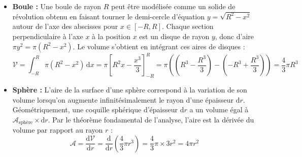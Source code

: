 \documentclass{article}
\begin{document}
{\begin{itemize}
    \begin{center}
    \end{center}

    \item \textbf{Boule :}
    Une boule de rayon $R$ peut être modélisée comme un solide de révolution obtenu en faisant tourner le demi-cercle d'équation $y = \sqrt{R^2 - x^2}$ autour de l'axe des abscisses pour $x \in [-R, R]$. Chaque section perpendiculaire à l'axe $x$ à la position $x$ est un disque de rayon $y$, donc d'aire $\pi y^2 = \pi(R^2 - x^2)$. Le volume s'obtient en intégrant ces aires de disques :
    $$\mathcal{V} = \int_{-R}^{R} \pi (R^2 - x^2) \, \mathrm{d}x = \pi \left[ R^2x - \frac{x^3}{3} \right]_{-R}^{R} = \pi \left( \left(R^3 - \frac{R^3}{3}\right) - \left(-R^3 + \frac{R^3}{3}\right) \right) = \frac{4}{3}\pi R^3$$
    
    \begin{center}
    \end{center}

    \item \textbf{Sphère :}
    L'aire de la surface d'une sphère correspond à la variation de son volume lorsqu'on augmente infinitésimalement le rayon d'une épaisseur $\mathrm{d}r$. Géométriquement, une coquille sphérique d'épaisseur $\mathrm{d}r$ a un volume égal à $\mathcal{A}_{\text{sphère}} \times \mathrm{d}r$. Par le théorème fondamental de l'analyse, l'aire est la dérivée du volume par rapport au rayon $r$ :
    $$\mathcal{A} = \frac{\mathrm{d}\mathcal{V}}{\mathrm{d}r} = \frac{\mathrm{d}}{\mathrm{d}r}\left(\frac{4}{3}\pi r^3\right) = \frac{4}{3}\pi \times 3r^2 = 4\pi r^2$$
    

\end{itemize}}
\end{document}
